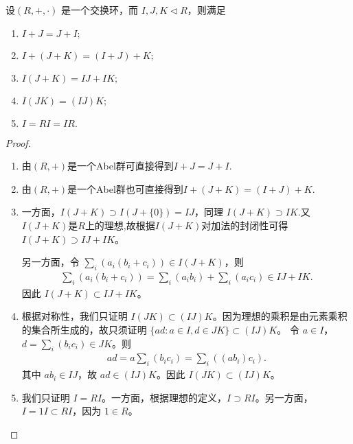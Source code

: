 \documentclass[../../main.tex]{subfiles}
\begin{document}
\begin{proposition}[理想关于加法和乘法的运算律]
设$(R, +, \cdot)$ 是一个交换环，而 $I, J, K \lhd R$，则满足
\begin{enumerate}[(1)]
\item $I + J = J + I ;$
\item $I + (J + K) = (I + J) + K ;$
\item $I(J + K) = IJ + IK;$
\item $I(JK) = (IJ)K ;$
\item $I = RI = IR .$
\end{enumerate}
\end{proposition}
\begin{proof}
\begin{enumerate}[(1)]
\item 由$(R,+)$是一个Abel群可直接得到$I + J = J + I .$

\item 由$(R,+)$是一个Abel群也可直接得到$I + (J + K) = (I + J) + K .$

\item 一方面，$I(J + K) \supset I(J + \{0\}) = IJ$，同理 $I(J + K) \supset IK$.又$I(J + K)$是$R$上的理想,故根据$I(J+K)$对加法的封闭性可得 $I(J + K) \supset IJ + IK$。

另一方面，令 $\sum_i (a_i(b_i + c_i)) \in I(J + K)$，则
\begin{align*}
\sum_i (a_i(b_i + c_i)) = \sum_i (a_ib_i) + \sum_i (a_ic_i) \in IJ + IK .
\end{align*}
因此 $I(J + K) \subset IJ + IK$。

\item 根据对称性，我们只证明 $I(JK) \subset (IJ)K$。因为理想的乘积是由元素乘积的集合所生成的，故只须证明 $\{ad : a \in I, d \in JK\} \subset (IJ)K$。
令 $a \in I$，$d = \sum_i (b_ic_i) \in JK$。则
\begin{align*}
ad = a\sum_i (b_ic_i) = \sum_i ((ab_i)c_i) .
\end{align*}
其中 $ab_i \in IJ$，故 $ad \in (IJ)K$。因此 $I(JK) \subset (IJ)K$。

\item 我们只证明 $I = RI$。一方面，根据理想的定义，$I \supset RI$。另一方面，$I = 1I \subset RI$，因为 $1 \in R$。
\end{enumerate}

\end{proof}
\end{document}
